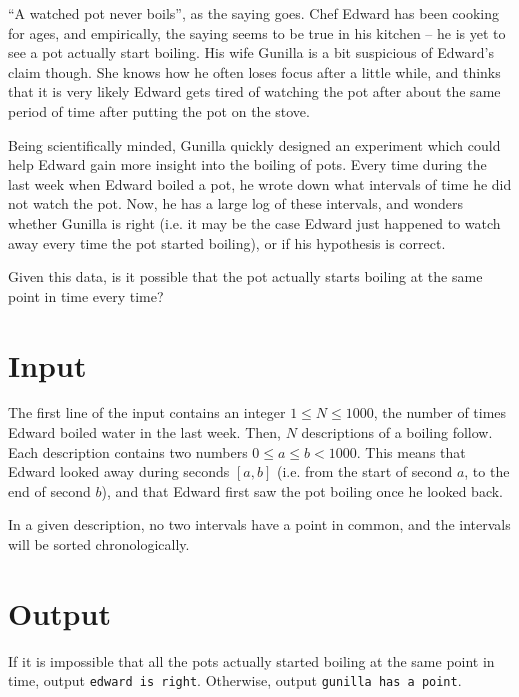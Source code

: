 ``A watched pot never boils'', as the saying goes.
Chef Edward has been cooking for ages, and empirically, the saying seems to be true in his kitchen -- he is yet to see a pot actually start boiling.
His wife Gunilla is a bit suspicious of Edward's claim though.
She knows how he often loses focus after a little while, and thinks that it is very likely Edward gets tired of watching the pot after about the same period of time after putting the pot on the stove.

Being scientifically minded, Gunilla quickly designed an experiment which could help Edward gain more insight into the boiling of pots.
Every time during the last week when Edward boiled a pot, he wrote down what intervals of time he did not watch the pot.
Now, he has a large log of these intervals, and wonders whether Gunilla is right (i.e. it may be the case Edward just happened to watch away every time the pot started boiling), or if his hypothesis is correct.

Given this data, is it possible that the pot actually starts boiling at the same point in time every time?

\section*{Input}
The first line of the input contains an integer $1 \le N \le 1000$, the number of times Edward boiled water in the last week.
Then, $N$ descriptions of a boiling follow.
Each description contains two numbers $0 \le a \le b < 1000$.
This means that Edward looked away during seconds $[a, b]$ (i.e. from the start of second $a$, to the end of second $b$), and that Edward first saw the pot boiling once he looked back.

In a given description, no two intervals have a point in common, and the intervals will be sorted chronologically.

\section*{Output}
If it is impossible that all the pots actually started boiling at the same point in time, output \texttt{edward is right}.
Otherwise, output \texttt{gunilla has a point}.
